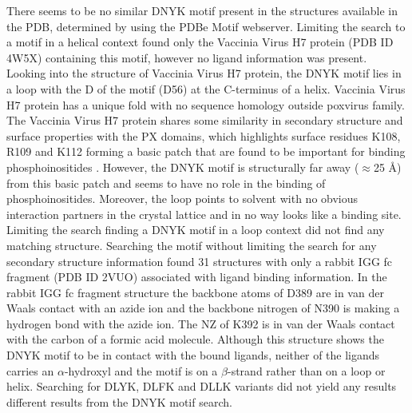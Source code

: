 	There seems to be no similar DNYK motif present in the structures available in the PDB, determined by using the PDBe Motif webserver. Limiting the search to a motif in a helical context found only the Vaccinia Virus H7 protein (PDB ID 4W5X) containing this motif, however no ligand information was present. Looking into the structure of Vaccinia Virus H7 protein, the DNYK motif lies in a loop with the D of the motif (D56) at the C-terminus of a helix. Vaccinia Virus H7 protein has a unique fold with no sequence homology outside poxvirus family. The Vaccinia Virus H7 protein shares some similarity in secondary structure and surface properties with the PX domains,  which highlights surface residues K108, R109 and K112 forming a basic patch that are found to be important for binding phosphoinositides \parencite{Kolli2015}. However, the DNYK motif is structurally far away ($ \approx $25 \AA) from this basic patch and seems to have no role in the binding of phosphoinositides. Moreover, the loop points to solvent with no obvious interaction partners in the crystal lattice and in no way looks like a binding site. Limiting the search finding a DNYK motif in a loop context did not find any matching structure. Searching the motif without limiting the search for any secondary structure information found 31 structures with only a rabbit IGG fc fragment (PDB ID 2VUO) associated with ligand binding information. In the rabbit IGG fc fragment structure the backbone atoms of D389 are in van der Waals contact with an azide ion and the backbone nitrogen of N390 is making a hydrogen bond with the azide ion. The NZ of K392 is in van der Waals contact with the carbon of a formic acid molecule. Although this structure shows the DNYK motif to be in contact with the bound ligands, neither of the ligands carries an $ \alpha $-hydroxyl and the motif is on a $ \beta $-strand rather than on a loop or helix. Searching for DLYK, DLFK and DLLK variants did not yield any results different results from the DNYK motif search.
	
